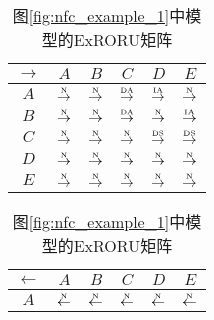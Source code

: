 \begin{table}[htbp]
  \centering
  \setlength\tabcolsep{4pt}
  \caption{图\ref{fig:nfc_example}中两个模型的ExRORU矩阵}
  \label{tab:nfc_example_matrix}
  \vspace{6pt}
  \begin{subtable}{1\textwidth}
    \centering
    \caption{图\ref{fig:nfc_example_1}中模型的ExRORU矩阵}
    \label{tab:nfc_example_1_matrix}
    \begin{minipage}[b]{0.3\textwidth}
      \centering
      \begin{tabular}{|c|c|c|c|c|c|} \hline
        $\rightarrow$ & $A$ & $B$ & $C$ & $D$ & $E$\\ \hline
        $A$ & $\overset{\text{\tiny{N}}}{\rightarrow}$ & $\overset{\text{\tiny{N}}}{\rightarrow}$ & $\overset{\text{\tiny{DA}}}{\rightarrow}$ & \cellcolor{lightgray}$\overset{\text{\tiny{IA}}}{\rightarrow}$ & \cellcolor{lightgray}$\overset{\text{\tiny{N}}}{\rightarrow}$\\ \hline
        $B$ & $\overset{\text{\tiny{N}}}{\rightarrow}$ & $\overset{\text{\tiny{N}}}{\rightarrow}$ & $\overset{\text{\tiny{DA}}}{\rightarrow}$ & \cellcolor{lightgray}$\overset{\text{\tiny{N}}}{\rightarrow}$ & \cellcolor{lightgray}$\overset{\text{\tiny{IA}}}{\rightarrow}$\\ \hline
        $C$ & $\overset{\text{\tiny{N}}}{\rightarrow}$ & $\overset{\text{\tiny{N}}}{\rightarrow}$ & $\overset{\text{\tiny{N}}}{\rightarrow}$ & $\overset{\text{\tiny{DS}}}{\rightarrow}$ & $\overset{\text{\tiny{DS}}}{\rightarrow}$\\ \hline
        $D$ & $\overset{\text{\tiny{N}}}{\rightarrow}$ & $\overset{\text{\tiny{N}}}{\rightarrow}$ & $\overset{\text{\tiny{N}}}{\rightarrow}$ & $\overset{\text{\tiny{N}}}{\rightarrow}$ & $\overset{\text{\tiny{N}}}{\rightarrow}$\\ \hline
        $E$ & $\overset{\text{\tiny{N}}}{\rightarrow}$ & $\overset{\text{\tiny{N}}}{\rightarrow}$ & $\overset{\text{\tiny{N}}}{\rightarrow}$ & $\overset{\text{\tiny{N}}}{\rightarrow}$ & $\overset{\text{\tiny{N}}}{\rightarrow}$\\ \hline
      \end{tabular}
    \end{minipage}
    \begin{minipage}[b]{0.3\textwidth}
      \centering
      \begin{tabular}{|c|c|c|c|c|c|} \hline
        $\leftarrow$ & $A$ & $B$ & $C$ & $D$ & $E$\\ \hline
        $A$ & $\overset{\text{\tiny{N}}}{\leftarrow}$ & $\overset{\text{\tiny{N}}}{\leftarrow}$ & $\overset{\text{\tiny{N}}}{\leftarrow}$ & $\overset{\text{\tiny{N}}}{\leftarrow}$ & $\overset{\text{\tiny{N}}}{\leftarrow}$\\ \hline

\end{tabular}
\end{minipage}
\end{subtable}
\end{table}
